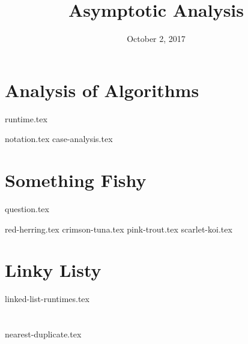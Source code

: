 \documentclass[11pt]{exam}
\title{Asymptotic Analysis}
\date{October 2, 2017}
\begin{document}
\maketitle

\section{Analysis of Algorithms}
{runtime.tex}
\begin{questions}
{notation.tex}
{case-analysis.tex}
\end{questions}

\clearpage
\section{Something Fishy}
{question.tex}
\begin{questions}
{red-herring.tex}
{crimson-tuna.tex}
{pink-trout.tex}
{scarlet-koi.tex}
\end{questions}

\clearpage
\section{Linky Listy}
\begin{questions}
{linked-list-runtimes.tex}
\end{questions}

\clearpage
\section{}
\begin{questions}
{nearest-duplicate.tex}
\end{questions}
\end{document}
